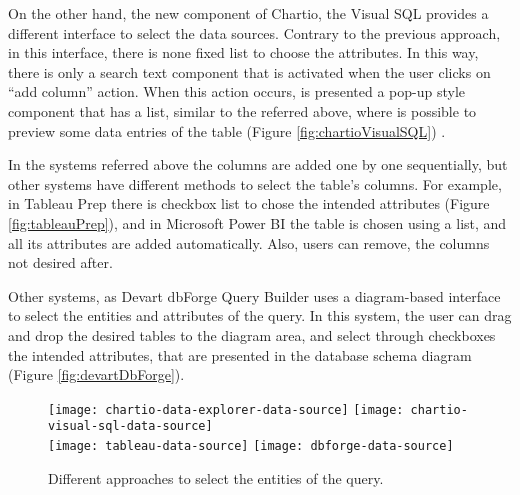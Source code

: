 On the other hand, the new component of Chartio, the Visual SQL provides a different interface to select the data sources. Contrary to the previous approach, in this interface, there is none fixed list to choose the attributes. In this way, there is only a search text component that is activated when the user clicks on “add column” action. When this action occurs, is presented a pop-up style component that has a list, similar to the referred above, where is possible to preview some data entries of the table (Figure \ref{fig:chartioVisualSQL}) \cite{chartioVisualSQL}. 

In the systems referred above the columns are added one by one sequentially, but other systems have different methods to select the table’s columns. For example, in Tableau Prep \cite{tableauPrep} there is checkbox list to chose the intended attributes (Figure \ref{fig:tableauPrep}), and in Microsoft Power BI \cite{powerBI} the table is chosen using a list, and all its attributes are added automatically. Also, users can remove, the columns not desired after. \cite{tableauPrepHelpWhatsNew} \cite{powerBIShapeAndCombineData}

Other systems, as Devart dbForge Query Builder \cite{dbForgeQueryBuilder} uses a diagram-based interface to select the entities and attributes of the query. In this system, the user can drag and drop the desired tables to the diagram area, and select through checkboxes the intended attributes, that are presented in the database schema diagram (Figure \ref{fig:devartDbForge}).


\begin{figure}[htbp]
    \centering
      {\texttt{[image: chartio-data-explorer-data-source]}}%
      {\texttt{[image: chartio-visual-sql-data-source]}}%
      \\
    {\texttt{[image: tableau-data-source]}}%
    {\texttt{[image: dbforge-data-source]}}%
  \caption{Different approaches to select the entities of the query.}
    \label{fig:approaches_select_data_sources}
  \end{figure}

